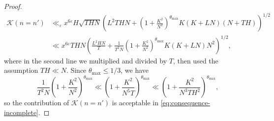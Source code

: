 \documentclass[reqno,11pt]{amsart}
\theoremstyle{remark}
\numberwithin{equation}{section}
\newcommand{\mK}{\mathcal{K}}
\newcommand{\eps}{\varepsilon}
\begin{document}
\begin{proof}
\[\begin{aligned}
    \mK(n = n') &\ll_{\eps} x^{6\eps} H \sqrt{THN} \left(L^2 TH N + \left(1 + \frac{K^2}{N^2}\right)^{\theta_{\max}} K (K + LN)(N + TH) \right)^{1/2}
    \\
    &\ll 
    x^{6\eps} THN \left(\frac{L^2 H N}{T} + \frac{1}{T^2N}\left(1 + \frac{K^2}{N^2}\right)^{\theta_{\max}} K (K + LN)N^2 \right)^{1/2},
\end{aligned}
\]
where in the second line we multiplied and divided by $T$, then used the assumption $TH \ll N$. Since $\theta_{\max} \le 1/3$, we have 
\[
    \frac{1}{T^2N}\left(1 + \frac{K^2}{N^2}\right)^{\theta_{\max}}
    \ll 
    \left(1 + \frac{K^2}{N^5 T}\right)^{\theta_{\max}}
    \ll 
    \left(1 + \frac{K^2}{N^3 TH^2}\right)^{\theta_{\max}},
\]
so the contribution of $\mK(n = n')$ is acceptable in \cref{eq:consequence-incomplete}.


\end{proof}
\end{document}
